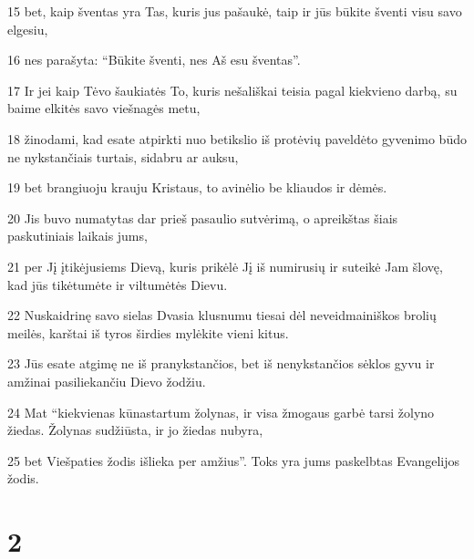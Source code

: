 \par 15 bet, kaip šventas yra Tas, kuris jus pašaukė, taip ir jūs būkite šventi visu savo elgesiu, 
\par 16 nes parašyta: “Būkite šventi, nes Aš esu šventas”. 
\par 17 Ir jei kaip Tėvo šaukiatės To, kuris nešališkai teisia pagal kiekvieno darbą, su baime elkitės savo viešnagės metu, 
\par 18 žinodami, kad esate atpirkti nuo betikslio iš protėvių paveldėto gyvenimo būdo ne nykstančiais turtais, sidabru ar auksu, 
\par 19 bet brangiuoju krauju Kristaus, to avinėlio be kliaudos ir dėmės. 
\par 20 Jis buvo numatytas dar prieš pasaulio sutvėrimą, o apreikštas šiais paskutiniais laikais jums, 
\par 21 per Jį įtikėjusiems Dievą, kuris prikėlė Jį iš numirusių ir suteikė Jam šlovę, kad jūs tikėtumėte ir viltumėtės Dievu. 
\par 22 Nuskaidrinę savo sielas Dvasia klusnumu tiesai dėl neveidmainiškos brolių meilės, karštai iš tyros širdies mylėkite vieni kitus. 
\par 23 Jūs esate atgimę ne iš pranykstančios, bet iš nenykstančios sėklos gyvu ir amžinai pasiliekančiu Dievo žodžiu. 
\par 24 Mat “kiekvienas kūnas­tartum žolynas, ir visa žmogaus garbė tarsi žolyno žiedas. Žolynas sudžiūsta, ir jo žiedas nubyra, 
\par 25 bet Viešpaties žodis išlieka per amžius”. Toks yra jums paskelbtas Evangelijos žodis.


\chapter{2}


